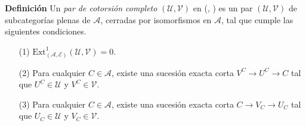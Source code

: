 \documentclass[preview]{standalone}
\begin{document}
\begin{center}
\justifying \textbf{Definición} Un \emph{par de cotorsión completo} $(\mathcal{U}, \mathcal{V})$ en (, ) es un par $(\mathcal{U}, \mathcal{V})$ de subcategorías plenas de $\mathscr{A}$, cerradas por isomorfismos en $\mathscr{A}$, tal que cumple las siguientes condiciones.\begin{itemize} \item[(1)] $\text{Ext}^1_{(\mathscr{A}, \mathscr{E})}(\mathcal{U}, \mathcal{V}) = 0$. \item[(2)] Para cualquier $C\in\mathscr{A}$, existe una sucesión exacta corta $V^C\to U^C\to C$ tal que $U^C\in\mathcal{U}$ y $V^C\in\mathcal{V}$. \item[(3)] Para cualquier $C\in\mathscr{A}$, existe una sucesión exacta corta $C\to V_C\to U_C$ tal que $U_C\in\mathcal{U}$ y $V_C\in\mathcal{V}$. \end{itemize}
\end{center}
\end{document}
